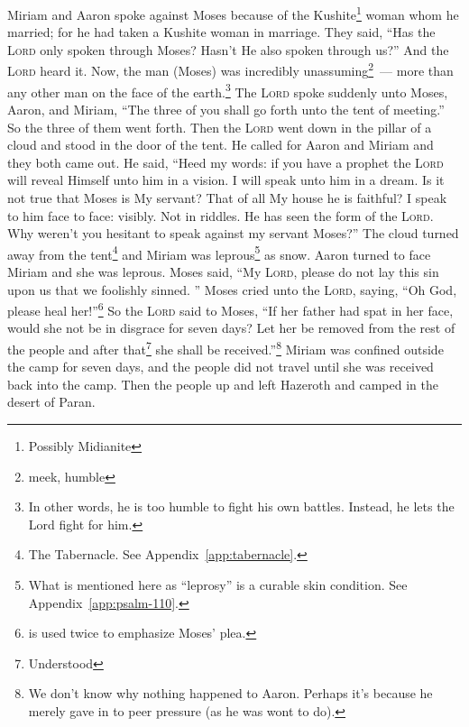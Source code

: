 
\begin{inparaenum}
     Miriam and Aaron spoke against Moses because of the Kushite\footnote{Possibly Midianite} woman whom he married; for he had taken a Kushite woman in marriage.%
     They said, ``Has the \textsc{Lord} only spoken through Moses? Hasn't He also spoken through us?'' And the \textsc{Lord} heard it.%
     Now, the man (Moses) was incredibly unassuming\footnote{meek, humble}~--- more than any other man on the face of the earth.\footnote{In other words, he is too humble to fight his own battles. Instead, he lets the Lord fight for him.}%
     The \textsc{Lord} spoke suddenly unto Moses, Aaron, and Miriam, ``The three of you shall go forth unto the tent of meeting.'' So the three of them went forth.%
     Then the \textsc{Lord} went down in the pillar of a cloud and stood in the door of the tent. He called for Aaron and Miriam and they both came out.%
     He said, ``Heed my words: if you have a prophet the \textsc{Lord} will reveal Himself unto him in a vision. I will speak unto him in a dream.%
     Is it not true that Moses is My servant? That of all My house he is faithful?%
     I speak to him face to face: visibly. Not in riddles. He has seen the form of the \textsc{Lord}. Why weren't you hesitant to speak against my servant Moses?''%
     The cloud turned away from the tent\footnote{The Tabernacle. See Appendix~\ref{app:tabernacle}.} and Miriam was leprous\footnote{What is mentioned here as ``leprosy'' is a curable skin condition. See Appendix~\ref{app:psalm-110}.} as snow. Aaron turned to face Miriam and she was leprous.
     Moses said, ``My \textsc{Lord}, please do not lay this sin upon us that we foolishly sinned.%
     ''%
     Moses cried unto the \textsc{Lord}, saying, ``Oh God, please heal her!''\footnote{ is used twice to emphasize Moses' plea.}%
     So the \textsc{Lord} said to Moses, ``If her father had spat in her face, would she not be in disgrace for seven days? Let her be removed from the rest of the people and after that\footnote{Understood} she shall be received.''\footnote{We don't know why nothing happened to Aaron. Perhaps it's because he merely gave in to peer pressure (as he was wont to do).}%
     Miriam was confined outside the camp for seven days, and the people did not travel until she was received back into the camp.%
     Then the people up and left Hazeroth and camped in the desert of Paran.%
\end{inparaenum}
